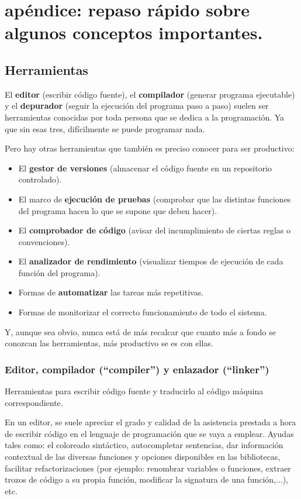 \documentclass[spanish,12pt,a4paper,final,oneside]{book}
\begin{document}
\chapter{apéndice: repaso rápido sobre algunos conceptos importantes.}

\section{Herramientas}

El \textbf{editor} (escribir código fuente), el \textbf{compilador} (generar programa ejecutable) y el \textbf{depurador} (seguir la ejecución del programa paso a paso) suelen ser herramientas conocidas por toda persona que se dedica a la programación. Ya que sin esas tres, difícilmente se puede programar nada.

Pero hay otras herramientas que también es preciso conocer para ser productivo:
\begin{itemize}
\item El \textbf{gestor de versiones} (almacenar el código fuente en un repositorio controlado).
\item El marco de \textbf{ejecución de pruebas} (comprobar que las distintas funciones del programa hacen lo que se supone que deben hacer).
\item El \textbf{comprobador de código} (avisar del incumplimiento de ciertas reglas o convenciones).
\item El \textbf{analizador de rendimiento} (visualizar tiempos de ejecución de cada función del programa).
\item Formas de \textbf{automatizar} las tareas más repetitivas.
\item Formas de monitorizar el correcto funcionamiento de todo el sistema.
\end{itemize}

Y, aunque sea obvio, nunca está de más recalcar que cuanto más a fondo se conozcan las herramientas, más productivo se es con ellas.


\subsection{Editor, compilador (``compiler'') y enlazador (``linker'')}
Herramientas para escribir código fuente y traducirlo al código máquina correspondiente.

En un editor, se suele apreciar el grado y calidad de la asistencia prestada a hora de escribir código en el lenguaje de programación que se vaya a emplear. Ayudas tales como: el coloreado sintáctico, autocompletar sentencias, dar información contextual de las diversas funciones y opciones disponibles en las bibliotecas, facilitar refactorizaciones (por ejemplo: renombrar variables o funciones, extraer trozos de código a su propia función, modificar la signatura de una función,...), etc.
\end{document}
